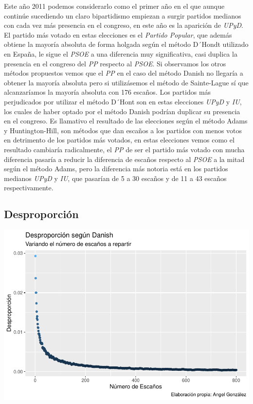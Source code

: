 \documentclass[12pt,a4paper,]{book}
\numberwithin{dummy}{section}
\theoremstyle{ocrenumbox}
\theoremstyle{blacknumex}
\theoremstyle{blacknumbox}
\theoremstyle{ocrenum}
\theoremstyle{ocrenum}
\begin{document}
Este año 2011 podemos considerarlo como el primer año en el que aunque
continúe sucediendo un claro bipartidismo empiezan a surgir partidos
medianos con cada vez más presencia en el congreso, en este año es la
aparición de \emph{UPyD}. El partido más votado en estas elecciones es
el \emph{Partido Popular}, que además obtiene la mayoría absoluta de
forma holgada según el método D´Hondt utilizado en España, le sigue el
\emph{PSOE} a una diferencia muy significativa, casi duplica la
presencia en el congreso del \emph{PP} respecto al \emph{PSOE}. Si
observamos los otros métodos propuestos vemos que el \emph{PP} en el
caso del método Danish no llegaría a obtener la mayoría absoluta pero si
utilizásemos el método de Sainte-Lague sí que alcanzaríamos la mayoría
absoluta con 176 escaños. Los partidos más perjudicados por utilizar el
método D´Hont son en estas elecciones \emph{UPyD} y \emph{IU}, los
cuales de haber optado por el método Danish podrían duplicar su
presencia en el congreso. Es llamativo el resultado de las elecciones
según el método Adams y Huntington-Hill, son métodos que dan escaños a
los partidos con menos votos en detrimento de los partidos más votados,
en estas elecciones vemos como el resultado cambiaría radicalmente, el
\emph{PP} de ser el partido más votado con mucha diferencia pasaría a
reducir la diferencia de escaños respecto al \emph{PSOE} a la mitad
según el método Adams, pero la diferencia más notoria está en los
partidos medianos \emph{UPyD} y \emph{IU}, que pasarían de 5 a 30
escaños y de 11 a 43 escaños respectivamente.

\hypertarget{desproporciuxf3n-10}{%
\subsection{Desproporción}\label{desproporciuxf3n-10}}

\begin{center}\includegraphics[width=1\linewidth]{figurasR/unnamed-chunk-36-1} \end{center}
\end{document}
